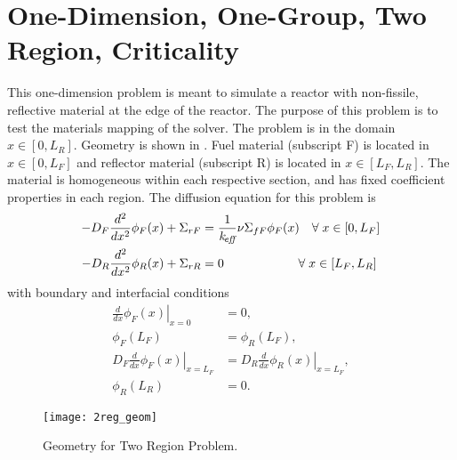 \section{One-Dimension, One-Group, Two Region, Criticality}
  \label{sec:deriv_2reg}
  This one-dimension problem is meant to simulate a reactor with non-fissile,
  reflective material at the edge of the reactor. The purpose of this problem is
  to test the materials mapping of the solver. The problem is in the domain 
  $x \in [0,L_R]$. Geometry is shown in . Fuel material 
  (subscript F) is located in $x \in [0,L_F]$ and reflector material 
  (subscript R) is located in $ x \in [L_F,L_R]$. The material is homogeneous 
  within each respective section, and has fixed coefficient properties in each
  region.
  The diffusion equation for this problem is 
  \begin{align}
    \label{eq:2regF}
    -D_F \frac{d^2}{dx^2} \phi_F(x) + \Sigma_{rF} &= \frac{1}{k_{\!\mbox{\scriptsize \em eff}}} \nu
      \Sigma_{fF} \phi_F(x) \quad \forall \; x \in [0,L_F] \\
    \label{eq:2regR}
    -D_R \frac{d^2}{dx^2} \phi_R(x) + \Sigma_{rR} &= 0  
      \qquad \qquad \qquad \forall \; x \in [L_F,L_R]
  \end{align}
  with boundary and interfacial conditions
  \begin{align}
    \label{eq:2reg_bc0}
    \left. \frac{d}{dx} \phi_F(x) \right|_{x=0} &= 0, \\
    \label{eq:2reg_flux_continuity}
    \phi_F(L_F) &= \phi_R(L_F) ,\\
    \label{eq:2reg_current_continuity}
    D_F \left. \frac{d}{dx} \phi_F(x) \right|_{x=L_F} &= 
      D_R \left. \frac{d}{dx} \phi_R(x) \right|_{x=L_F} ,\\
    \label{eq:2reg_bcLR}
    \phi_R(L_R) &= 0.
  \end{align}
  \begin{figure}
    \centering
    \texttt{[image: 2reg\_geom]}
    \caption{Geometry for Two Region Problem.}
    \label{fig:2reg_geom}
  \end{figure}

